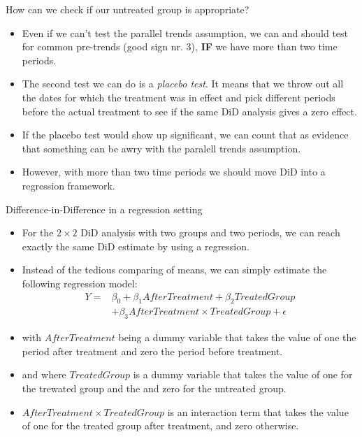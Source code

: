 \documentclass[notes,11pt, aspectratio=169]{beamer}
\begin{document}
\begin{frame}{How can we check if our untreated group is appropriate?}
\begin{itemize}
\item Even if we can't test the parallel trends assumption, we can and should test for common pre-trends (good sign nr. 3), \textbf{IF} we have more than two time periods.
\item The second test we can do is a \emph{placebo test}. It means that we throw out all the dates for which the treatment was in effect and pick different periods before the actual treatment to see if the same DiD analysis gives a zero effect.
\item If the placebo test would show up significant, we can count that as evidence that something can be awry with the paralell trends assumption. 
\item However, with more than two time periods we should move DiD into a regression framework.
\end{itemize}
\end{frame}


\begin{frame}{Difference-in-Difference in a regression setting}
\begin{itemize}
\item For the $2\times2$ DiD analysis with two groups and two periods, we can reach exactly the same DiD estimate by using a regression.
\item Instead of the tedious comparing of means, we can simply estimate the following regression model:
\begin{align}
Y = &\beta_0 + \beta_1 AfterTreatment + \beta_2 TreatedGroup\\ \nonumber
&+ \beta_3 AfterTreatment \times TreatedGroup + \epsilon
\end{align}
\item with  $AfterTreatment$ being a dummy variable that takes the value of one the period after treatment and zero the period before treatment.
\item and where $TreatedGroup$ is a dummy variable that takes the value of one for the trewated group and the and zero for the untreated group. 
\item  $AfterTreatment \times TreatedGroup$ is an interaction term that takes the value of one for the treated group after treatment, and zero otherwise.
\end{itemize}
\end{frame}
\end{document}
